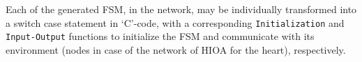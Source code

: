 Each of the generated \ac{FSM}, in the network, may be individually
transformed into a switch case statement in `C'-code, with a
corresponding \texttt{Initialization} and \texttt{Input-Output}
functions to initialize the \ac{FSM} and communicate with its
environment (nodes in case of the network of \ac{HIOA} for the heart),
respectively.


